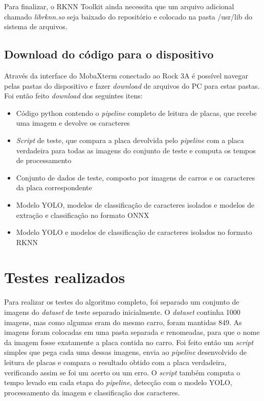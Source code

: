 Para finalizar, o RKNN Toolkit ainda necessita que um arquivo adicional chamado \textit{librknn.so} seja baixado do repositório e colocado na pasta /usr/lib do sistema de arquivos.

\subsection{Download do código para o dispositivo}
Através da interface do MobaXterm conectado ao Rock 3A é possível navegar pelas pastas do dispositivo e fazer \textit{download} de arquivos do PC para estas pastas. Foi então feito \textit{download} dos seguintes itens:
\begin{itemize} 
\item Código python contendo o \textit{pipeline} completo de leitura de placas, que recebe uma imagem e devolve os caracteres 
\item \textit{Script} de teste, que compara a placa devolvida pelo \textit{pipeline} com a placa verdadeira para todas as imagens do conjunto de teste e computa os tempos de processamento 
\item Conjunto de dados de teste, composto por imagens de carros e os caracteres da placa correspondente 
\item Modelo YOLO, modelos de classificação de caracteres isolados e modelos de extração e classificação no formato ONNX 
\item Modelo YOLO e modelos de classificação de caracteres isolados no formato RKNN 
\end{itemize}

\section{Testes realizados}
Para realizar os testes do algoritmo completo, foi separado um conjunto de imagens do \textit{dataset} de teste separado inicialmente. O \textit{dataset} continha 1000 imagens, mas como algumas eram do mesmo carro, foram mantidas 849. As imagens foram colocadas em uma pasta separada e renomeadas, para que o nome da imagem fosse exatamente a placa contida no carro.
Foi feito então um \textit{script} simples que pega cada uma dessas imagens, envia ao \textit{pipeline} desenvolvido de leitura de placas e compara o resultado obtido com a placa verdadeira, verificando assim se foi um acerto ou um erro. O \textit{script} também computa o tempo levado em cada etapa do \textit{pipeline}, detecção com o modelo YOLO, processamento da imagem e classificação dos caracteres.

